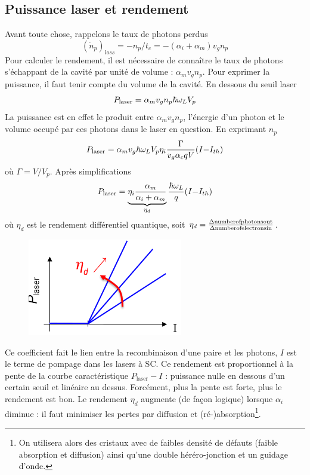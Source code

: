 	\subsection{Puissance laser et rendement}
	Avant toute chose, rappelons le taux de photons perdus	
	\begin{equation}
	{({\dot n_p})_{loss}} =  - {n_p}/{t_c} =  - ({\alpha _i} + {\alpha _m}){v_g}{n_p}
	\end{equation}
	Pour calculer le rendement, il est nécessaire de connaître le taux de photons s'échappant de la
	cavité par unité de volume : $\alpha_mv_gn_p$. Pour exprimer la puissance, il faut tenir compte
	du volume de la cavité. En dessous du seuil laser
	\begin{equation}
	{P_{{\rm{laser}}}} = {\alpha _m}{v_g}{n_p}\hbar {\omega _L}{V_p}
	\end{equation}
	La puissance est en effet le produit entre $\alpha_mv_gn_p$, l'énergie d'un photon et le volume 
	occupé par ces photons dans le laser en question. En exprimant $n_p$
	\begin{equation}
	{P_{{\rm{laser}}}} = {\alpha _m}{v_g}\hbar {\omega _L}{V_p}{\eta _i}\frac{\Gamma }{{{v_g}{\alpha
	 _c}qV}}({I - }{{I}_{th}})
	\end{equation}
	où $\Gamma = V/V_p$. Après simplifications
	\begin{equation}
	{P_{{\rm{laser}}}} = \underbrace{{\eta _i}\frac{{{\alpha _m}}}{{{\alpha _i} + {\alpha _m}}}}
	_{\eta_d}\frac{{\hbar	 {\omega _L}}}{q}({I - }{{I}_{th}})
	\end{equation}
	où $\eta_d$  est le rendement différentiel quantique, soit $\eta_d=\frac{{\Delta {\rm{ number of
	photons out}}}}{{\Delta {\rm{ number of electrons in}}}}$.\\

	\begin{figure}
	\vspace{-8mm}
	\includegraphics[scale=0.8]{ch5/image51}
	\end{figure}			
	Ce coefficient fait le lien entre 
	la recombinaison d'une paire et les photons, $I$ est le terme de pompage dans les lasers à SC.	
	Ce rendement est proportionnel à la pente de la courbe caractéristique $P_{\text{laser}} - I$ : 
	puissance nulle en dessous d'un certain seuil et linéaire au dessus. Forcément, plus la pente 
	est forte, plus le rendement est bon. Le rendement $\eta_d$ augmente (de façon logique) lorsque 
	$\alpha_i$ diminue : il faut minimiser les pertes par diffusion et (ré-)absorption\footnote{On 
	utilisera alors des cristaux avec de faibles densité de défauts (faible absorption et diffusion) 
	ainsi qu'une double héréro-jonction et un guidage d'onde.}.\\
	
